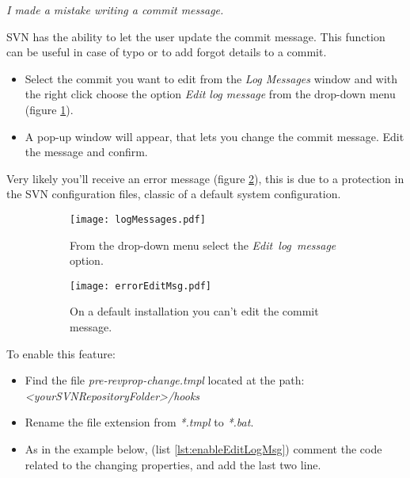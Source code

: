 \textit{I made a mistake writing a commit message.} \newline


SVN has the ability to let the user update the commit message. This function can be useful in case of typo or to add forgot details to a commit.\newline

\begin{itemize}

    \item Select the commit you want to edit from the \textit{Log Messages} window and with the right click choose the option \textit{Edit log message} from the drop-down menu (figure \ref{fig:logMessages}).
    
    \item A pop-up window will appear, that lets you change the commit message. Edit the message and confirm.
    
\end{itemize}

Very likely you'll receive an error message (figure \ref{fig:errorEditMsg}), this is due to a protection in the SVN configuration files, classic of a default system configuration.





\begin{figure}[htbp]
\begin{subfigure}{0.5\textwidth}
  \centering
  \texttt{[image: logMessages.pdf]}
  \caption{From the drop-down menu select the \hbox{\textit{Edit log message}} option.}
  \label{fig:logMessages}
\end{subfigure}%
\hspace{5mm}
\begin{subfigure}{0.5\textwidth}
  \centering
  \texttt{[image: errorEditMsg.pdf]}
  \caption{On a default installation you can't edit the commit message.}
  \label{fig:errorEditMsg}
\end{subfigure}
\caption{}
\label{fig:svnEditLogMsg}
\end{figure}


\newpage

To enable this feature:

\begin{itemize}

    \item Find the file \textit{pre-revprop-change.tmpl} located at the path: \textit{<yourSVNRepositoryFolder>/hooks}
    
    \item Rename the file extension from \textit{*.tmpl} to \textit{*.bat}.
    
    \item As in the example below, (list \ref{lst:enableEditLogMsg}) comment the code related to the changing properties, and add the last two line.
    
\end{itemize}


